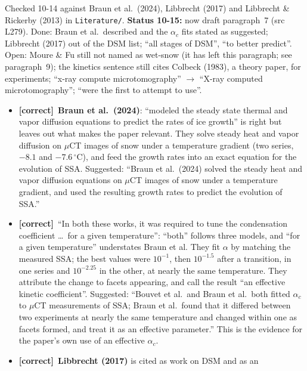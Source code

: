 \documentclass[11pt]{article}
\newcommand{\tC}{\textcolor{miss}{\textbf{[correct]}}\ }
\newcommand{\add}[1]{\textcolor{revX}{#1}}
\begin{document}
\begin{enumerate}
  Checked 10-14 against Braun et al.\ (2024), Libbrecht (2017) and
  Libbrecht \& Rickerby (2013) in \texttt{Literature/}.
  \add{\textbf{Status 10-15:} now draft paragraph~7 (src L279). Done:
  Braun et al.\ described and the $\alpha_c$ fits stated as suggested;
  Libbrecht (2017) out of the DSM list; ``all stages of DSM'', ``to better
  predict''. Open: Moure \& Fu still not named as wet-snow (it has left this
  paragraph; see paragraph~9); the kinetics sentence still cites Colbeck
  (1983), a theory paper, for experiments; ``x-ray compute
  microtomography'' $\to$ ``X-ray computed microtomography'';
  ``were the first to attempt to use''.}
  \begin{itemize}
  \item \tC \textbf{Braun et al.\ (2024)}: ``modeled the steady state
    thermal and vapor diffusion equations to predict the rates of ice
    growth'' is right but leaves out what makes the paper relevant. They
    solve steady heat and vapor diffusion on $\mu$CT images of snow under a
    temperature gradient (two series, $-8.1$ and $-7.6\,^{\circ}$C), and
    feed the growth rates into an exact equation for the evolution of SSA.
    Suggested: ``Braun et al.\ (2024) solved the steady heat and vapor
    diffusion equations on $\mu$CT images of snow under a temperature
    gradient, and used the resulting growth rates to predict the evolution
    of SSA.''
  \item \tC ``In both these works, it was required to tune the condensation
    coefficient \ldots\ for a given temperature'': ``both'' follows three
    models, and ``for a given temperature'' understates Braun et al. They
    fit $\alpha$ by matching the measured SSA; the best values were
    $10^{-1}$, then $10^{-1.5}$ after a transition, in one series and
    $10^{-2.25}$ in the other, at nearly the same temperature. They
    attribute the change to facets appearing, and call the result ``an
    effective kinetic coefficient''. Suggested: ``Bouvet et al.\ and Braun
    et al.\ both fitted $\alpha_c$ to $\mu$CT measurements of SSA; Braun et
    al.\ found that it differed between two experiments at nearly the same
    temperature and changed within one as facets formed, and treat it as an
    effective parameter.'' This is the evidence for the paper's own use of
    an effective $\alpha_c$.
  \item \tC \textbf{Libbrecht (2017)} is cited as work on DSM and as an

\end{itemize}
\end{enumerate}
\end{document}
